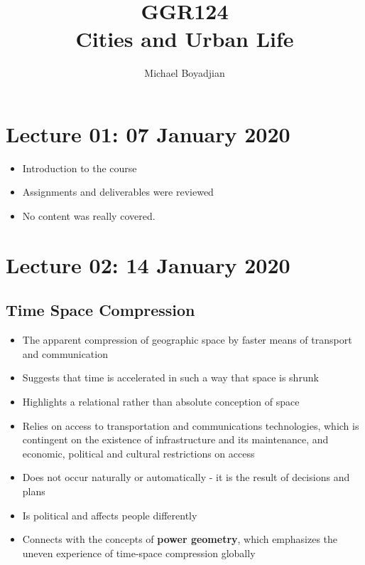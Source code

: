 \documentclass[11pt]{article}
\begin{document}
\title{GGR124 \\ Cities and Urban Life}
\author{Michael Boyadjian}
\maketitle
\pagebreak

\tableofcontents

\pagebreak

\bigskip
\bigskip
\bigskip

\section{Lecture 01: 07 January 2020}

\begin{itemize}
\item Introduction to the course
\item Assignments and deliverables were reviewed
\item No content was really covered.
\end{itemize}


\section{Lecture 02: 14 January 2020}

\subsection{Time Space Compression}
\begin{itemize}
\item The apparent compression of geographic space by faster means of transport and communication
\item Suggests that time is accelerated in such a way that space is shrunk
\item Highlights a relational rather than absolute conception of space
\item Relies on access to transportation and communications technologies, which is contingent on the existence of infrastructure and its maintenance, and economic, political and cultural restrictions on access
\item Does not occur naturally or automatically - it is the result of decisions and plans
\item Is political and affects people differently
\item Connects with the concepts of 
\textbf{power geometry}, which emphasizes the uneven experience of time-space compression globally
\end{itemize}
\end{document}
